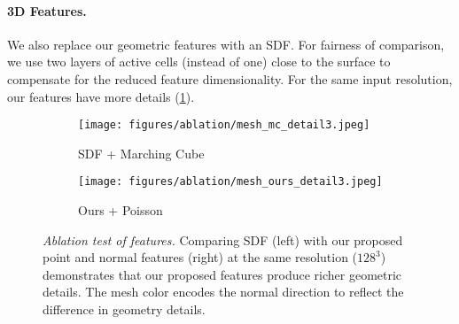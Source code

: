 \vspace*{-2mm}
\paragraph{3D Features.} We also replace our geometric features with an SDF. For fairness of comparison, we use two layers of active cells (instead of one) close to the surface to compensate for the reduced feature dimensionality.
For the same input resolution, our features have more details (\cref{fig:ablation_feature}).


\begin{figure}[h]

    \begin{subfigure}{.48\linewidth}
      \centering
      \texttt{[image: figures/ablation/mesh\_mc\_detail3.jpeg]}
      \caption{SDF + Marching Cube~\cite{lorensen1998marching}}
    \end{subfigure}
     \begin{subfigure}{.48\linewidth}
      \centering
      \texttt{[image: figures/ablation/mesh\_ours\_detail3.jpeg]}
       \caption{Ours + Poisson~\cite{kazhdan_screened_2013}}
    \end{subfigure}
    \vspace*{-2mm}
    \caption{\emph{Ablation test of features.} Comparing SDF (left) with our proposed point and normal features (right) at the same resolution ($128^3$) demonstrates that our proposed features produce richer geometric details. The mesh color encodes the normal direction to reflect the difference in geometry details.\vspace*{-4mm}} 
    \label{fig:ablation_feature}
\end{figure}



